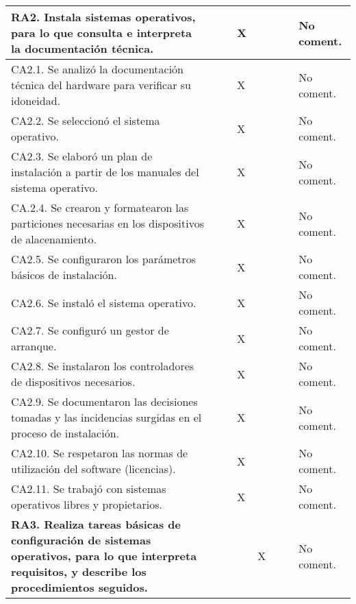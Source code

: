 \documentclass[a4paper,oneside,titlepage,12pt]{article}
\begin{document}
\begin{tabularx}{\textwidth}{| X | M{0.5cm} | M{0.5cm} | M{0.5cm} | M{0.5cm} | M{0.5cm} | M{0.5cm} | m{5cm} |}
    \textbf{RA2. Instala sistemas operativos, para lo que consulta e interpreta la documentación técnica.} &  &  & X &  &  &  & No coment. \\\hline
    
    \quad CA2.1. Se analizó la documentación técnica del hardware para verificar su idoneidad. &  &  & X &  &  &  & No coment. \\\hline
    
    \quad CA2.2. Se seleccionó el sistema operativo. &  &  & X &  &  &  & No coment. \\\hline
    
    \quad CA2.3. Se elaboró un plan de instalación a partir de los manuales del sistema operativo. &  &  & X &  &  &  & No coment. \\\hline
    
    \quad CA.2.4. Se crearon y formatearon las particiones necesarias en los dispositivos de alacenamiento. &  &  & X &  &  &  & No coment. \\\hline
    
    \quad CA2.5. Se configuraron los parámetros básicos de instalación. &  &  & X &  &  &  & No coment. \\\hline
    
    \quad CA2.6. Se instaló el sistema operativo. &  &  & X &  &  &  & No coment. \\\hline
    
    \quad CA2.7. Se configuró un gestor de arranque. &  &  & X &  &  &  & No coment. \\\hline
    
    \quad CA2.8. Se instalaron los controladores de dispositivos necesarios. &  &  & X &  &  &  & No coment. \\\hline
    
    \quad CA2.9. Se documentaron las decisiones tomadas y las incidencias surgidas en el proceso de instalación. &  &  & X &  &  &  & No coment. \\\hline
    
    \quad CA2.10. Se respetaron las normas de utilización del software (licencias). &  &  & X &  &  &  & No coment. \\\hline
    
    \quad CA2.11. Se trabajó con sistemas operativos libres y propietarios. &  &  & X &  &  &  & No coment. \\\hline\hline
    
    \textbf{RA3. Realiza tareas básicas de configuración de sistemas operativos, para lo que interpreta requisitos, y describe los procedimientos seguidos.} &  &  &  & X &  &  & No coment. \\\hline
    

\end{tabularx}
\end{document}
